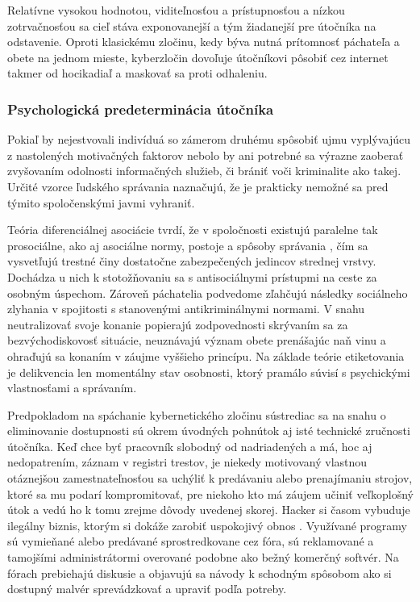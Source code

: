 \documentclass[12pt, a4paper]{article}
\begin{document}
Relatívne vysokou hodnotou, viditeľnosťou a prístupnosťou a nízkou zotrvačnosťou sa cieľ stáva 
exponovanejší a tým žiadanejší pre útočníka na odstavenie. Oproti klasickému zločinu, kedy býva nutná 
prítomnosť páchateľa a obete na jednom mieste, kyberzločin dovoľuje útočníkovi pôsobiť cez internet takmer 
od hocikadiaľ a maskovať sa proti odhaleniu.

\subsubsection{Psychologická predeterminácia útočníka}
Pokiaľ by nejestvovali indivíduá so zámerom druhému spôsobiť ujmu vyplývajúcu z nastolených motivačných
faktorov nebolo by ani potrebné sa výrazne zaoberať zvyšovaním odolnosti informačných služieb, či brániť
voči kriminalite ako takej. Určité vzorce ľudského správania naznačujú, že je prakticky nemožné sa pred 
týmito spoločenskými javmi vyhraniť.

Teória diferenciálnej asociácie tvrdí, že v spoločnosti existujú paralelne tak prosociálne, ako aj asociálne 
normy, postoje a spôsoby správania \cite{heretik}, čím sa vysvetľujú trestné činy dostatočne zabezpečených 
jedincov strednej vrstvy. Dochádza u nich k stotožňovaniu sa s antisociálnymi prístupmi na ceste za osobným 
úspechom. Zároveň páchatelia podvedome zľahčujú následky  sociálneho zlyhania v spojitosti s stanovenými 
antikriminálnymi normami. V snahu neutralizovať svoje konanie popierajú zodpovednosti skrývaním sa za 
bezvýchodiskovosť situácie, neuznávajú význam obete  prenášajúc naň vinu a ohraďujú sa konaním v záujme 
vyššieho princípu. Na základe teórie etiketovania je delikvencia len momentálny stav osobnosti, ktorý 
pramálo súvisí s psychickými vlastnosťami a správaním.

Predpokladom na spáchanie kybernetického zločinu sústrediac sa na snahu o eliminovanie dostupnosti
sú okrem úvodných pohnútok aj isté technické zručnosti útočníka. Keď chce byť pracovník slobodný od 
nadriadených a má, hoc aj nedopatrením, záznam v registri trestov, je niekedy motivovaný vlastnou 
otáznejšou zamestnateľnosťou sa uchýliť k predávaniu alebo prenajímaniu strojov, ktoré sa mu podarí 
kompromitovať, pre niekoho kto má záujem učiniť veľkoplošný útok a vedú ho k tomu zrejme dôvody uvedenej 
skorej. Hacker si časom  vybuduje ilegálny biznis, ktorým si dokáže zarobiť uspokojivý obnos 
\cite{infiltrating-botnet}. Využívané programy sú vymieňané alebo predávané sprostredkovane cez fóra,
sú reklamované a tamojšími administrátormi overované podobne ako bežný komerčný softvér. Na fórach 
prebiehajú diskusie a objavujú sa návody k schodným spôsobom ako si dostupný malvér sprevádzkovať 
a upraviť podľa potreby.
\end{document}
